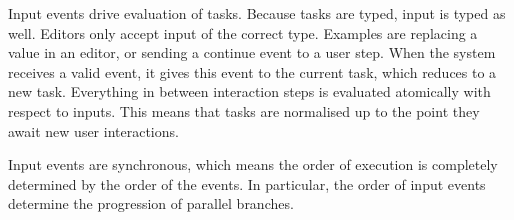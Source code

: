 Input events drive evaluation of tasks.
Because tasks are typed, input is typed as well.
Editors only accept input of the correct type.
Examples are replacing a value in an editor,
or sending a continue event to a user step.
When the system receives a valid event, it gives this event to the current task, which reduces to a new task.
Everything in between interaction steps is evaluated atomically with respect to inputs.
This means that tasks are normalised up to the point they await new user interactions.

Input events are synchronous, which means the order of execution is completely determined by the order of the events.
In particular, the order of input events determine the progression of parallel branches.
